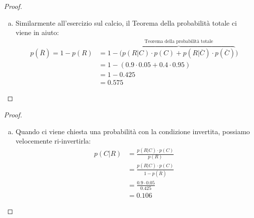 \documentclass{beamer}
\begin{document}
\begin{frame}[fragile]
	\begin{proof}\renewcommand{\qedsymbol}{$\square$}
		\begin{enumerate}[(a)]
			\item Similarmente all'esercizio sul calcio, il Teorema della probabilità totale ci viene in aiuto: \begin{align*}
				      p(\overline R) = 1 - p(R) & = 1 - \big( \overbrace{p(R|C) \cdot p(C) + p(R|\overline C) \cdot p(\overline C)}^{\text{Teorema della probabilità totale}} \big) \\
				      & = 1 - (0.9 \cdot 0.05 + 0.4 \cdot 0.95 ) \\
				      & = 1 - 0.425 \\
				      & = 0.575
			      \end{align*}
		\end{enumerate}
	\end{proof}
\end{frame}

\begin{frame}[fragile]
	\begin{proof}%
		\begin{enumerate}[(b)]
			\item Quando ci viene chiesta una probabilità con la condizione invertita, possiamo velocemente ri-invertirla: \begin{align*}
				      p(C|R) & = \frac{p(R|C)\cdot p(C)}{p(R)} \\
				      & = \frac{p(R|C) \cdot p(C)}{1 - p(\overline R)} \\ %
				      & = \frac{0.9\cdot 0.05}{0.425} \\
				      & = 0.106
			      \end{align*}
		\end{enumerate}
	\end{proof}
\end{frame}
\end{document}
